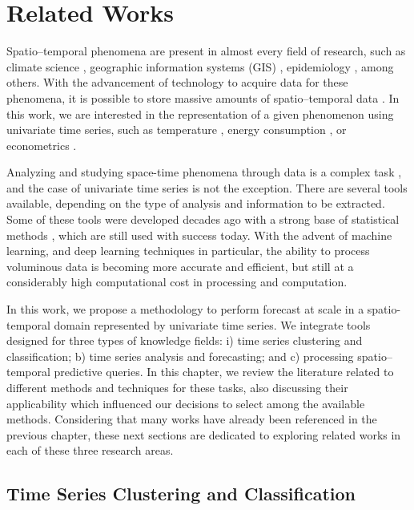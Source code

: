 \chapter{Related Works}
\label{chapter_Related_Works}

Spatio--temporal phenomena are present in almost every field of research, such as climate science \cite{Faghmous2014, Guevara2020}, geographic information systems (GIS) \cite{ElGeresy2002, Shekhar2015}, epidemiology \cite{Malchow2007, Cabrera2019}, among others. With the advancement of technology to acquire data for these phenomena, it is possible to store massive amounts of spatio--temporal data \cite{Atluri2018}. In this work, we are interested in the representation of a given phenomenon using univariate time series, such as temperature \cite{Muhammet2012, Romilly2005}, energy consumption \cite{Abdelaal2008}, or econometrics \cite{Moral2003}.

Analyzing and studying space-time phenomena through data is a complex task \cite{Rao2008}, and the case of univariate time series is not the exception. There are several tools available, depending on the type of analysis and information to be extracted. Some of these tools were developed decades ago with a strong base of statistical methods \cite{Cressie2011, Finkenstadt2006}, which are still used with success today. With the advent of machine learning, and deep learning techniques in particular, the ability to process voluminous data is becoming more accurate and efficient, but still at a considerably high computational cost in processing and computation. %

In this work, we propose a methodology to perform forecast at scale in a spatio-temporal domain represented by univariate time series. We integrate tools designed for three types of knowledge fields: i) time series clustering and classification; b) time series analysis and forecasting; and c) processing spatio--temporal predictive queries. In this chapter, we review the literature related to different methods and techniques for these tasks, also discussing their applicability which influenced our decisions to select among the available methods. Considering that many works have already been referenced in the previous chapter, these next sections are dedicated to exploring related works in each of these three research areas.

\section{Time Series Clustering and Classification}
\label{Sec:ClusteringRelatedWorks}


